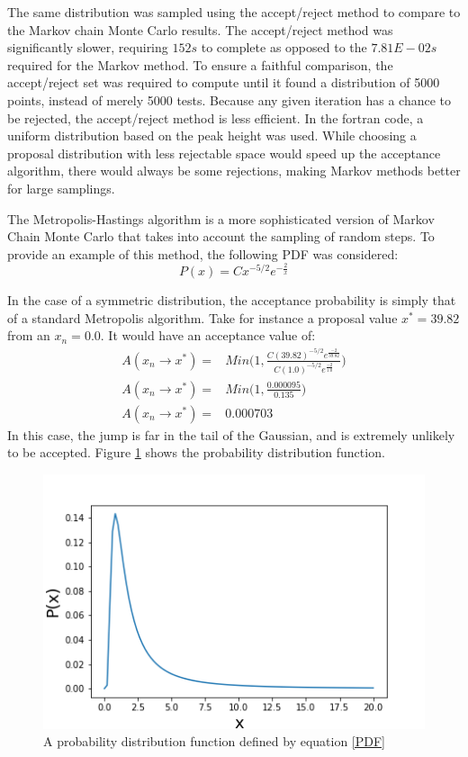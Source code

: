 \message{ !name(Assn1.tex)}\documentclass[twocolumn]{article}
\begin{document}
The same distribution was sampled using the accept/reject method to compare to the Markov chain Monte Carlo results. The accept/reject method was significantly slower, requiring $152s$ to complete as opposed to the $7.81E-02s$ required for the Markov method. To ensure a faithful comparison, the accept/reject set was required to compute until it found a distribution of 5000 points, instead of merely 5000 tests. Because any given iteration has a chance to be rejected, the accept/reject method is less efficient. In the fortran code, a uniform distribution based on the peak height was used. While choosing a proposal distribution with less rejectable space would speed up the acceptance algorithm, there would always be some rejections, making Markov methods better for large samplings.

The Metropolis-Hastings algorithm is a more sophisticated version of Markov Chain Monte Carlo that takes into account the sampling of random steps. To provide an example of this method, the following PDF was considered:
\begin{equation}
P(x) = Cx^{-5/2}e^{-\frac{2}{x}}
\label{PDF}
\end{equation}

In the case of a symmetric distribution, the acceptance probability is simply that of a standard Metropolis algorithm. Take for instance a proposal value $x^* = 39.82$ from an $x_n=0.0$. It would have an acceptance value of:
\begin{equation}
\begin{split}
A(x_n \to x^*) =& Min \Bigg( 1, \frac{C(39.82)^{-5/2}e^{\frac{-2}{39.82}}}{C(1.0)^{-5/2}e^{\frac{-2}{1.0}}} \Bigg) \\
A(x_n \to x^*) =& Min \Bigg( 1, \frac{0.000095}{0.135} \Bigg) \\
A(x_n \to x^*) =& 0.000703
\end{split}
\end{equation}
In this case, the jump is far in the tail of the Gaussian, and is extremely unlikely to be accepted. Figure \ref{fig:PDF} shows the probability distribution function.

\begin{figure}
\centering
\includegraphics[width=\linewidth]{PDF}
\caption{A probability distribution function defined by equation \ref{PDF}}
\label{fig:PDF}
\end{figure}
\end{document}
